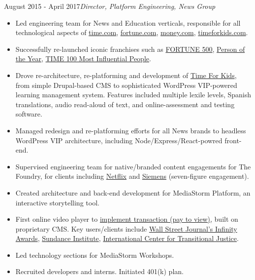 \documentclass[a4paper,10pt]{memoir} %
\begin{document}

 {August 2015 - April 2017}{\textit{Director, Platform Engineering, News Group}}
\begin{itemize}
	\item Led engineering team for News and Education verticals, responsible for all technological aspects of \href{http://time.com}{time.com}, \href{http://fortune.com}{fortune.com},  \href{http://money.com}{money.com}, \href{https://www.timeforkids.com}{timeforkids.com}. 
	\item Successfully re-launched iconic franchises such as \href{http://fortune.com/fortune500}{FORTUNE 500}, \href{http://time.com/time-person-of-the-year-2017-silence-breakers/}{Person of the Year}, \href{http://time.com/collection/most-influential-people-2018/}{TIME 100 Most Influential People}.
	\item Drove re-architecture, re-platforming and development of \href{https://www.timeforkids}{Time For Kids}, from simple Drupal-based CMS to sophisticated WordPress VIP-powered learning management system. Features included multiple lexile levels, Spanish translations, audio read-aloud of text, and online-assessment and testing software.
	\item Managed redesign and re-platforming efforts for all News brands to headless WordPress VIP architecture, including Node/Express/React-powred front-end.
	\item Supervised engineering team for native/branded content engagements for The Foundry, for clients including \href{http://time.com/paid-content-from/netflix/dinnertime/}{Netflix} and \href{http://time.com/partner/siemens/innovation-starts-here/}{Siemens} (seven-figure engagement).
\end{itemize}
\Sep %

\begin{itemize}
	\item Created architecture and back-end development for MediaStorm Platform, an interactive storytelling tool. 
	\item First online video player to \href{http://time.com/46716/game-changer-mediastorm-launches-pay-per-story-video-player/}{implement transaction (pay to view)}, built on proprietary CMS. Key users/clients include \href{https://mediastorm.com/clients/2018-icp-infinity-awards}{Wall Street Journal's Infinity Awards}, \href{https://mediastorm.com/clients/sundance-short-film-challenge}{Sundance Institute}, \href{https://mediastorm.com/clients/i-am-not-who-they-think-i-am-for-ictj}{International Center for Transitional Justice}. 
	\item Led technology sections for MediaStorm Workshops.
	\item Recruited developers and interns. Initiated 401(k) plan.
\end{itemize}
\Sep %
\end{document}
